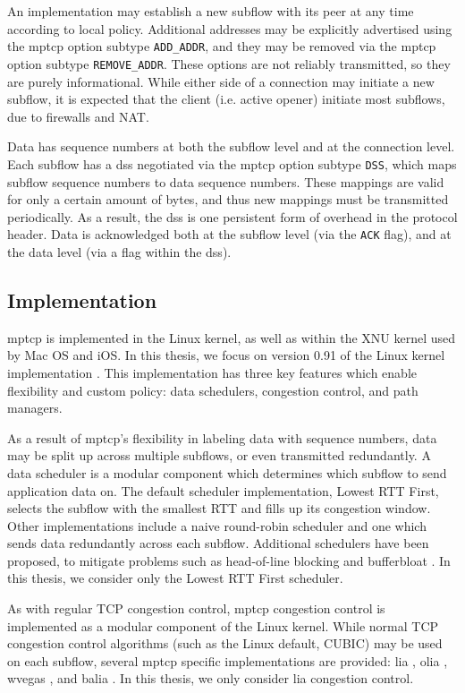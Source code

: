 \documentclass{cwru}
\begin{document}
An implementation may establish a new subflow with its peer at any time
according to local policy. Additional addresses may be explicitly advertised
using the \ac{mptcp} option subtype \texttt{ADD\_ADDR}, and they may be removed
via the \ac{mptcp} option subtype \texttt{REMOVE\_ADDR}. These options are not
reliably transmitted, so they are purely informational. While either side of a
connection may initiate a new subflow, it is expected that the client (i.e.
active opener) initiate most subflows, due to firewalls and NAT.

Data has sequence numbers at both the subflow level and at the connection level.
Each subflow has a \ac{dss} negotiated via the \ac{mptcp} option subtype
\texttt{DSS}, which maps subflow sequence numbers to data sequence numbers.
These mappings are valid for only a certain amount of bytes, and thus new
mappings must be transmitted periodically. As a result, the \ac{dss} is one
persistent form of overhead in the protocol header. Data is acknowledged both
at the subflow level (via the \texttt{ACK} flag), and at the data level (via a
flag within the \ac{dss}).

\subsection{Implementation}

\ac{mptcp} is implemented in the Linux kernel, as well as within the XNU kernel
used by Mac OS and iOS. In this thesis, we focus on version 0.91 of the Linux
kernel implementation \cite{mptcp}. This implementation has three key features
which enable flexibility and custom policy: data schedulers, congestion control,
and path managers.

As a result of \ac{mptcp}'s flexibility in labeling data with sequence numbers,
data may be split up across multiple subflows, or even transmitted redundantly.
A data scheduler is a modular component which determines which subflow to send
application data on. The default scheduler implementation, Lowest RTT First,
selects the subflow with the smallest RTT and fills up its congestion window.
Other implementations include a naive round-robin scheduler and one which sends
data redundantly across each subflow. Additional schedulers have been proposed,
to mitigate problems such as head-of-line blocking and bufferbloat
\cite{paasch2014experimental}. In this thesis, we consider only the Lowest RTT
First scheduler.

As with regular TCP congestion control, \ac{mptcp} congestion control is
implemented as a modular component of the Linux kernel. While normal TCP
congestion control algorithms (such as the Linux default, CUBIC) may be used on
each subflow, several \ac{mptcp} specific implementations are provided: \ac{lia}
\cite{rfc6356}, \ac{olia} \cite{draft-olia}, \ac{wvegas} \cite{draft-wvegas},
and \ac{balia} \cite{draft-balia}. In this thesis, we only consider \ac{lia}
congestion control.
\end{document}
